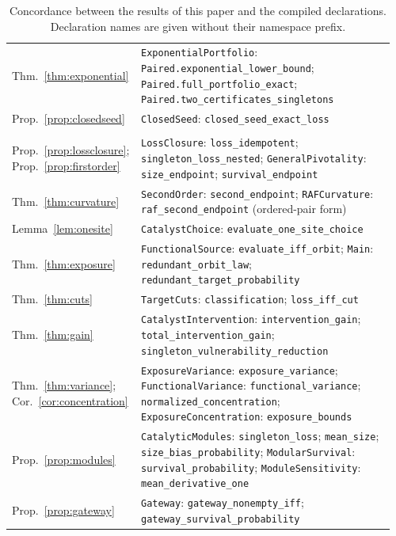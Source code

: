 \documentclass[11pt,a4paper]{article}
\theoremstyle{plain}
\theoremstyle{definition}
\theoremstyle{remark}
\newcommand{\lean}[1]{\texttt{#1}}
\begin{document}
\begin{table}[htbp]
\begin{tabular}{@{}>{\raggedright\arraybackslash}p{0.30\linewidth}>{\raggedright\arraybackslash}p{0.66\linewidth}@{}}
Thm.~\ref{thm:exponential} & \lean{ExponentialPortfolio}: \lean{Paired.exponential\_lower\_bound}; \lean{Paired.full\_portfolio\_exact}; \lean{Paired.two\_certificates\_singletons} \\
Prop.~\ref{prop:closedseed} & \lean{ClosedSeed}: \lean{closed\_seed\_exact\_loss} \\
\midrule
\multicolumn{2}{@{}l}{\emph{Namespace} \lean{RAFReactionCriticality}} \\
Prop.~\ref{prop:lossclosure}; Prop.~\ref{prop:firstorder} & \lean{LossClosure}: \lean{loss\_idempotent}; \lean{singleton\_loss\_nested}; \lean{GeneralPivotality}: \lean{size\_endpoint}; \lean{survival\_endpoint} \\
Thm.~\ref{thm:curvature} & \lean{SecondOrder}: \lean{second\_endpoint}; \lean{RAFCurvature}: \lean{raf\_second\_endpoint} (ordered-pair form) \\
Lemma~\ref{lem:onesite} & \lean{CatalystChoice}: \lean{evaluate\_one\_site\_choice} \\
Thm.~\ref{thm:exposure} & \lean{FunctionalSource}: \lean{evaluate\_iff\_orbit}; \lean{Main}: \lean{redundant\_orbit\_law}; \lean{redundant\_target\_probability} \\
Thm.~\ref{thm:cuts} & \lean{TargetCuts}: \lean{classification}; \lean{loss\_iff\_cut} \\
Thm.~\ref{thm:gain} & \lean{CatalystIntervention}: \lean{intervention\_gain}; \lean{total\_intervention\_gain}; \lean{singleton\_vulnerability\_reduction} \\
Thm.~\ref{thm:variance}; Cor.~\ref{cor:concentration} & \lean{ExposureVariance}: \lean{exposure\_variance}; \lean{FunctionalVariance}: \lean{functional\_variance}; \lean{normalized\_concentration}; \lean{ExposureConcentration}: \lean{exposure\_bounds} \\
Prop.~\ref{prop:modules} & \lean{CatalyticModules}: \lean{singleton\_loss}; \lean{mean\_size}; \lean{size\_bias\_probability}; \lean{ModularSurvival}: \lean{survival\_probability}; \lean{ModuleSensitivity}: \lean{mean\_derivative\_one} \\
Prop.~\ref{prop:gateway} & \lean{Gateway}: \lean{gateway\_nonempty\_iff}; \lean{gateway\_survival\_probability} \\
\bottomrule
\end{tabular}
\caption{Concordance between the results of this paper and the compiled declarations. Declaration names are given without their namespace prefix.}
\label{tab:concordance}
\end{table}
\end{document}
